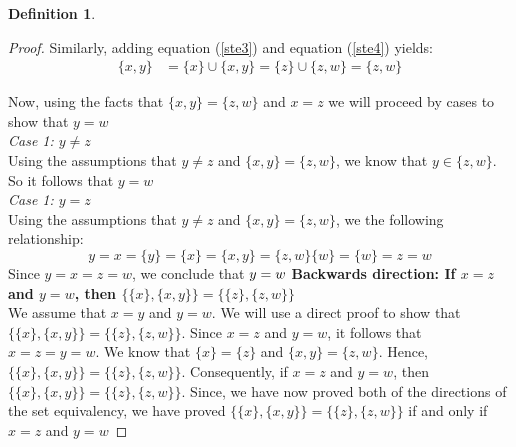 \documentclass{book}
\theoremstyle{definition}
\newtheorem{definition}{Definition}[section]
\theoremstyle{remark}
\begin{document}
\begin{definition}
\begin{proof}
        Similarly, adding equation (\ref{ste3}) and equation (\ref{ste4}) yields:
            \begin{align*}
                \{x,y\} & = \{x\} \cup \{x,y\} = \{z\} \cup \{z,w\} = \{z,w\}
            \end{align*}
        
        Now, using the facts that $\{x,y\} = \{z,w\}$ and  $x=z$ we will proceed by cases to show that $y=w$ \\
        
            \textit{Case 1: $y \neq z$} \\
                Using the assumptions that $y \neq z$ and $\{x,y\} = \{z,w\}$, we know that $y \in \{z,w \}$. So it follows that $y = w$ \\ 
            
            \textit{Case 1: $y = z$} \\
                Using the assumptions that $y \neq z$ and $\{x,y\} = \{z,w\}$, we the following relationship: 
                    \begin{equation*}
                          y = x = \{y \} = \{x\} = \{x,y\} = \{z,w\} \{w\} = \{w\} = z = w
                    \end{equation*}
                Since $y = x = z = w$, we conclude that $y = w  \\
                $
    \textbf{Backwards direction: If $x=z$ and $y=w$, then $\{ \{ x \}, \{ x, y \} \} =  \{ \{ z \}, \{ z, w \} \}$ } \\
    
        We assume that $x=y$ and $y=w$. We will use a direct proof to show that $\{ \{ x \}, \{ x, y \} \} =  \{ \{ z \}, \{ z, w \} \}$. Since $x=z$ and $y=w$, it follows that $x=z=y=w$. We know that $\{x \} = \{z \}$ and $\{x,y \} = \{z,w \}$. Hence, $\{ \{ x \}, \{ x, y \} \} =  \{ \{ z \}, \{ z, w \} \}$. Consequently, if $x=z$ and $y=w$, then $\{ \{ x \}, \{ x, y \} \} =  \{ \{ z \}, \{ z, w \} \}$.
    Since, we have now proved both of the directions of the set equivalency, we have proved $\{ \{ x \}, \{ x, y \} \} =  \{ \{ z \}, \{ z, w \} \}$ if and only if $x=z$ and $y=w$
\end{proof}
\end{definition}
\end{document}
